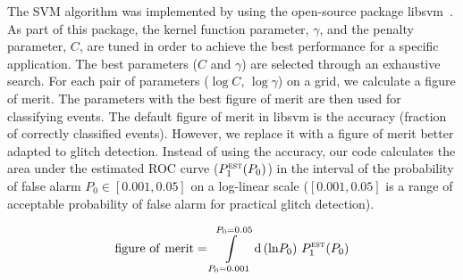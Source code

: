 \documentclass[prd, twocolumn, lengthcheck, superscriptaddress, showpacs, letterpaper, nofootinbib]{revtex4-1}
\begin{document}

The SVM algorithm was implemented by using the open-source package libsvm~\cite{CC01a}. As part of this package, the kernel function parameter, $\gamma$, and the penalty parameter, $C$, are tuned in order to achieve the best performance for a specific application. The best parameters ($C$ and $\gamma$) are selected through an exhaustive search. For each pair of parameters ($\log C$, $\log \gamma$) on a grid, we calculate a figure of merit. The parameters with the best figure of merit are then used for classifying events. The default figure of merit in libsvm is the accuracy (fraction of correctly classified events). However, we replace it with a figure of merit better adapted to glitch detection. Instead of using the accuracy, our code calculates the area under the estimated \ac{ROC} curve ($P_1^{\textsc{est}}(P_0)$) in the interval of the probability of false alarm $P_0 \in [0.001, 0.05]$ on a log-linear scale ($[0.001, 0.05]$ is a range of acceptable probability of false alarm for practical glitch detection).

\begin{equation}\label{SVM_figure_of_merit}
\mathrm{figure\ of \ merit} = \int\limits^{P_0 = 0.05}_{P_0=0.001} \mathrm{d}\,(\mathrm{ln} P_0)\ P_1^{\textsc{est}}(P_0)
\end{equation}
\end{document}
